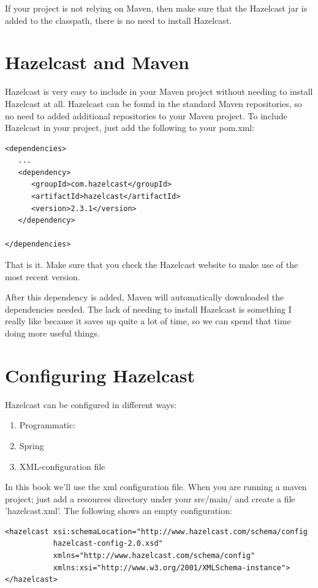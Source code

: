 If your project is not relying on Maven, then make sure that the Hazelcast jar is added to the classpath, there is no need to install Hazelcast.

\section{Hazelcast and Maven}
Hazelcast is very easy to include in your Maven project without needing to install Hazelcast at all. Hazelcast can be found in the standard Maven repositories, so no need to added additional repositories to your Maven project. To include Hazelcast in your project, just add the following to your pom.xml:
\begin{verbatim}
<dependencies>	
   ...
   <dependency>
      <groupId>com.hazelcast</groupId>
      <artifactId>hazelcast</artifactId>
      <version>2.3.1</version>
   </dependency>

</dependencies>
\end{verbatim}	
That is it. Make sure that you check the Hazelcast website to make use of the most recent version. 

After this dependency is added, Maven will automatically downloaded the dependencies needed.  The lack of needing to install Hazelcast is something I really like because it saves up quite a lot of time, so we can spend that time doing more useful things.

\section{Configuring Hazelcast}
Hazelcast can be configured in different ways:
\begin{enumerate}
\item Programmatic:
\item Spring
\item XML-configuration file
\end{enumerate}
In this book we'll use the xml configuration file. When you are running a maven project; just add a resources directory under your src/main/ and create a file 'hazelcast.xml'. The following shows an empty configuration:
\begin{verbatim}
<hazelcast xsi:schemaLocation="http://www.hazelcast.com/schema/config
           hazelcast-config-2.0.xsd"
           xmlns="http://www.hazelcast.com/schema/config"
           xmlns:xsi="http://www.w3.org/2001/XMLSchema-instance">
</hazelcast>
\end{verbatim}

